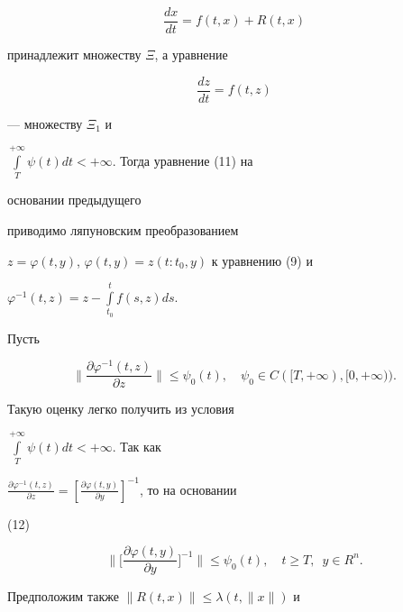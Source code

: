 \begin{equation} 


\frac{dx}{dt}=f(t,x)+R(t,x) 


\end{equation} 


принадлежит множеству $\Xi$, а уравнение 


\begin{equation}  


\frac{dz}{dt}=f(t,z) 


\end{equation}  


--- множеству $\Xi_1$ и 


$\int\limits^{+\infty}_T\psi(t)dt<+\infty$. Тогда уравнение (11) на 


основании предыдущего 


приводимо ляпуновским преобразованием 


$z=\varphi(t,y)$, $\varphi(t,y)=z(t:t_0,y)$ к уравнению (9) и 


$\varphi^{-1}(t,z)=z-\int\limits^t_{t_0}f(s,z)ds$. 


 


Пусть 


\begin{equation} 


\biggl\|\frac{\partial\varphi^{-1}(t,z)}{\partial z}\biggr\|\le 


\psi_0(t),\quad \psi_0\in C([T,+\infty),[0,+\infty)). 


\end{equation} 


Такую оценку легко получить из условия 


$\int\limits^{+\infty}_T\psi(t)dt<+\infty$. Так как 


$\frac{\partial\varphi^{-1}(t,z)}{\partial z}=\left[ 


\frac{\partial\varphi(t,y)}{\partial y}\right]^{-1}$, то на основании 


(12) 


\begin{equation} 


\biggl\|\biggl[\frac{\partial\varphi(t,y)}{\partial y} 


\biggr]^{-1} \biggr\|\le\psi_0(t),\quad t\ge T,\ \; y\in R^n. 


\end{equation} 


Предположим также $\|R(t,x)\|\le\lambda(t,\|x\|)$ и 


